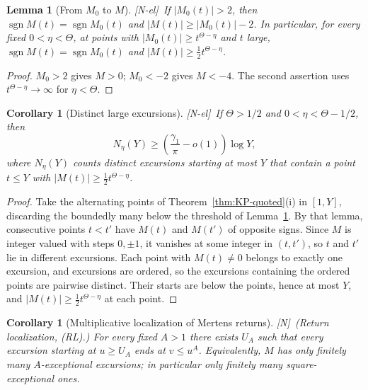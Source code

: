 \documentclass[11pt]{amsart}
\numberwithin{equation}{section}
\theoremstyle{plain}
\newtheorem{lemma}[theorem]{Lemma}
\newtheorem{corollary}[theorem]{Corollary}
\theoremstyle{definition}
\theoremstyle{remark}
\DeclareMathOperator{\sgn}{sgn}
\newcommand{\tagN}{\textup{[N]}}
\newcommand{\tagNE}{\textup{[N-el]}}
\begin{document}
\begin{lemma}[From $M_0$ to $M$]
\label{lem:KP-translation}
\tagNE\ If $|M_0(t)|>2$, then $\sgn M(t)=\sgn M_0(t)$ and
$|M(t)|\ge|M_0(t)|-2$. In particular, for every fixed $0<\eta<\Theta$, at points with
$|M_0(t)|\ge t^{\Theta-\eta}$ and $t$ large,
$\sgn M(t)=\sgn M_0(t)$ and $|M(t)|\ge\frac12t^{\Theta-\eta}$.
\end{lemma}

\begin{proof}
$M_0>2$ gives $M>0$; $M_0<-2$ gives $M<-4$. The second assertion uses
$t^{\Theta-\eta}\to\infty$ for $\eta<\Theta$.
\end{proof}

\begin{corollary}[Distinct large excursions]
\label{cor:KP-large-excursions}
\tagNE\ If $\Theta>1/2$ and $0<\eta<\Theta-1/2$, then
\begin{equation}
\label{eq:KP-large-excursions}
N_\eta(Y)\ge\left(\frac{\gamma_1}{\pi}-o(1)\right)\log Y,
\end{equation}
where $N_\eta(Y)$ counts distinct excursions starting at most $Y$ that
contain a point $t\le Y$ with $|M(t)|\ge\tfrac12 t^{\Theta-\eta}$.
\end{corollary}

\begin{proof}
Take the alternating points of Theorem~\ref{thm:KP-quoted}(i) in $[1,Y]$,
discarding the boundedly many below the threshold of
Lemma~\ref{lem:KP-translation}. By that lemma, consecutive points $t<t'$
have $M(t)$ and $M(t')$ of opposite signs. Since $M$ is integer valued with
steps $0,\pm1$, it vanishes at some integer in $(t,t')$, so $t$ and $t'$ lie
in different excursions. Each point with $M(t)\ne0$ belongs to exactly one
excursion, and excursions are ordered, so the excursions containing the
ordered points are pairwise distinct. Their starts are below the points,
hence at most $Y$, and $|M(t)|\ge\frac12t^{\Theta-\eta}$ at each point.
\end{proof}

\begin{corollary}[Multiplicative localization of Mertens returns]
\label{cor:KP-local-returns}
\tagN\ \textup{(Return localization, (RL).)} For every fixed $A>1$ there exists $U_A$ such that every excursion starting
at $u\ge U_A$ ends at $v\le u^A$. Equivalently, $M$ has only finitely many
$A$-exceptional excursions; in particular only finitely many
square-exceptional ones.
\end{corollary}
\end{document}
